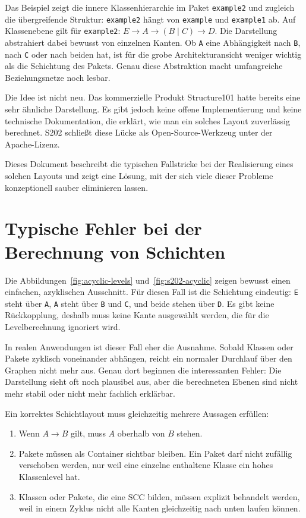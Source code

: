 \documentclass[a4paper,11pt]{article}
\begin{document}
Das Beispiel zeigt die innere Klassenhierarchie im Paket \texttt{example2}
und zugleich die \"ubergreifende Struktur: \texttt{example2} h\"angt von
\texttt{example} und \texttt{example1} ab. Auf Klassenebene gilt f\"ur
\texttt{example2}: $E \to A \to (B \mid C) \to D$. Die Darstellung abstrahiert
dabei bewusst von einzelnen Kanten. Ob \texttt{A} eine Abh\"angigkeit nach
\texttt{B}, nach \texttt{C} oder nach beiden hat, ist f\"ur die grobe
Architekturansicht weniger wichtig als die Schichtung des Pakets. Genau diese
Abstraktion macht umfangreiche Beziehungsnetze noch lesbar.

Die Idee ist nicht neu. Das kommerzielle Produkt Structure101 hatte bereits
eine sehr \"ahnliche Darstellung. Es gibt jedoch keine offene Implementierung
und keine technische Dokumentation, die erkl\"art, wie man ein solches Layout
zuverl\"assig berechnet. S202 schlie\ss{}t diese L\"ucke als Open-Source-Werkzeug
unter der Apache-Lizenz.

Dieses Dokument beschreibt die typischen Fallstricke bei der Realisierung
eines solchen Layouts und zeigt eine L\"osung, mit der sich viele dieser
Probleme konzeptionell sauber eliminieren lassen.

\section{Typische Fehler bei der Berechnung von Schichten}

Die Abbildungen~\ref{fig:acyclic-levels} und~\ref{fig:s202-acyclic} zeigen
bewusst einen einfachen, azyklischen Ausschnitt. F\"ur diesen Fall ist die
Schichtung eindeutig: \texttt{E} steht \"uber \texttt{A}, \texttt{A} steht
\"uber \texttt{B} und \texttt{C}, und beide stehen \"uber \texttt{D}. Es gibt
keine R\"uckkopplung, deshalb muss keine Kante ausgew\"ahlt werden, die f\"ur
die Levelberechnung ignoriert wird.

In realen Anwendungen ist dieser Fall eher die Ausnahme. Sobald Klassen oder
Pakete zyklisch voneinander abh\"angen, reicht ein normaler Durchlauf \"uber
den Graphen nicht mehr aus. Genau dort beginnen die interessanten Fehler: Die
Darstellung sieht oft noch plausibel aus, aber die berechneten Ebenen sind
nicht mehr stabil oder nicht mehr fachlich erkl\"arbar.

Ein korrektes Schichtlayout muss gleichzeitig mehrere Aussagen erf\"ullen:

\begin{enumerate}
  \item Wenn $A \to B$ gilt, muss $A$ oberhalb von $B$ stehen.
  \item Pakete m\"ussen als Container sichtbar bleiben. Ein Paket darf nicht
        zuf\"allig verschoben werden, nur weil eine einzelne enthaltene Klasse
        ein hohes Klassenlevel hat.
  \item Klassen oder Pakete, die eine SCC bilden, m\"ussen explizit behandelt
        werden, weil in einem Zyklus nicht alle Kanten gleichzeitig nach unten
        laufen k\"onnen.
\end{enumerate}
\end{document}
